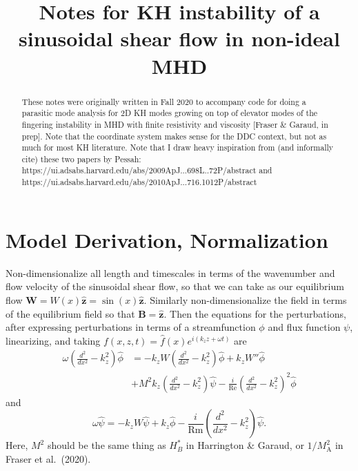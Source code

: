 \documentclass[aps,pop,preprint]{revtex4}
\begin{document}
	\title{Notes for KH instability of a sinusoidal shear flow in non-ideal MHD}
	\begin{abstract}
	These notes were originally written in Fall 2020 to accompany code for doing a parasitic mode analysis for 2D KH modes growing on top of elevator modes of the fingering instability in MHD with finite resistivity and viscosity [Fraser \& Garaud, in prep]. 
	Note that the coordinate system makes sense for the DDC context, but not as much for most KH literature.
	Note that I draw heavy inspiration from (and informally cite) these two papers by Pessah: https://ui.adsabs.harvard.edu/abs/2009ApJ...698L..72P/abstract and https://ui.adsabs.harvard.edu/abs/2010ApJ...716.1012P/abstract
	\end{abstract}
	\maketitle
	
	\section{Model Derivation, Normalization}
	\label{sec:derivation}
	Non-dimensionalize all length and timescales in terms of the wavenumber and flow velocity of the sinusoidal shear flow, so that we can take as our equilibrium flow $\mathbf{W} = W(x) \mathbf{\hat{z}} = \sin(x) \mathbf{\hat{z}}$. 
	Similarly non-dimensionalize the field in terms of the equilibrium field so that $\mathbf{B} = \mathbf{\hat{z}}$. 
	Then the equations for the perturbations, after expressing perturbations in terms of a streamfunction $\phi$ and flux function $\psi$, linearizing, and taking $f(x,z,t) = \hat{f}(x)e^{i (k_z z + \omega t)}$ are
	\begin{equation}\label{eq:linphieq}
	\begin{split}
	\omega \left( \frac{d^2}{dx^2} - k_z^2 \right) \hat{\phi} &= -k_z W \left( \frac{d^2}{dx^2} - k_z^2 \right) \hat{\phi} + k_z W'' \hat{\phi}\\ &+ M^2 k_z \left( \frac{d^2}{dx^2} - k_z^2 \right) \hat{\psi} - \frac{i}{\mathrm{Re}}\left(\frac{d^2}{dx^2} - k_z^2\right)^2\hat{\phi}
	\end{split}
	\end{equation}
	and
	\begin{equation}\label{eq:linpsieq}
	\omega \hat{\psi} = -k_z W \hat{\psi} + k_z \hat{\phi} - \frac{i}{\mathrm{Rm}}\left(\frac{d^2}{dx^2} - k_z^2\right)\hat{\psi}.
	\end{equation}
	Here, $M^2$ should be the same thing as $H_B^*$ in Harrington \& Garaud, or $1/M_\mathrm{A}^2$ in Fraser et al.~(2020).
	
\end{document}
